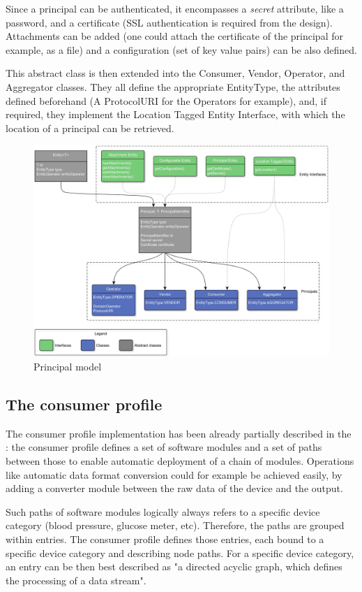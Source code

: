 Since a principal can be authenticated, it encompasses a \textit{secret} attribute, like a password, and a certificate (SSL authentication is required from the design). Attachments can be added (one could attach the certificate of the principal for example, as a file) and a configuration (set of key value pairs) can be also defined.

This abstract class is then extended into the Consumer, Vendor, Operator, and Aggregator classes. They all define the appropriate EntityType, the attributes defined beforehand (A ProtocolURI for the Operators for example), and, if required, they implement the Location Tagged Entity Interface, with which the location of a principal can be retrieved.

\begin{figure}[!hpbt]
	\centering
	\caption{Principal model}
	\label{fig:principals}
	\includegraphics[width=1\textwidth]{images/principals}
\end{figure}

\subsection{The consumer profile}
The consumer profile implementation has been already partially described in the :
the consumer profile defines a set of software modules and a set of paths between those to enable automatic deployment of a chain of modules. Operations like automatic data format conversion could for example be achieved easily, by adding a converter module between the raw data of the device and the output. 

Such paths of software modules logically always refers to a specific device category (blood pressure, glucose meter, etc). Therefore, the paths are grouped within entries. The consumer profile defines those entries, each bound to a specific device category and describing node paths. For a specific device category, an entry can be then best described as "a directed acyclic graph, which defines the processing of a data stream".

